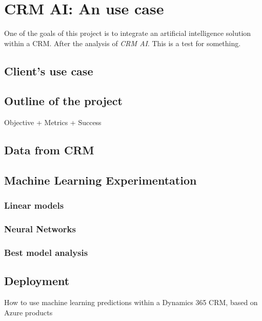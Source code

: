 \chapter{CRM AI: An use case}

One of the goals of this project is to integrate an artificial intelligence solution within a CRM. After the analysis of \textit{CRM AI}. This is a test for something.

\section{Client's use case}
\lipsum[1]


\section{Outline of the project}
Objective + Metrics + Success

\lipsum[1]

\section{Data from CRM}
\lipsum[1]


\section{Machine Learning Experimentation}
\lipsum[1]

\subsection{Linear models}
\lipsum[2]

\subsection{Neural Networks}
\lipsum[3]

\subsection{Best model analysis}
\lipsum[3]


\section{Deployment}
How to use machine learning predictions within a Dynamics 365 CRM, based on Azure products

